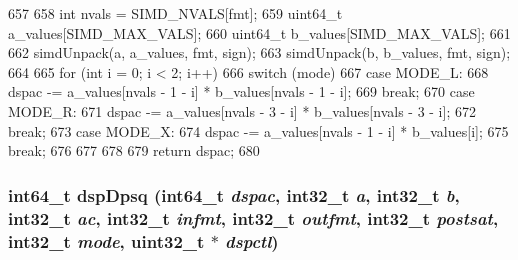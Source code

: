 \begin{DoxyCode}
657 {
658     int nvals = SIMD_NVALS[fmt];
659     uint64_t a_values[SIMD_MAX_VALS];
660     uint64_t b_values[SIMD_MAX_VALS];
661 
662     simdUnpack(a, a_values, fmt, sign);
663     simdUnpack(b, b_values, fmt, sign);
664 
665     for (int i = 0; i < 2; i++) {
666         switch (mode) {
667           case MODE_L:
668             dspac -= a_values[nvals - 1 - i] * b_values[nvals - 1 - i];
669             break;
670           case MODE_R:
671             dspac -= a_values[nvals - 3 - i] * b_values[nvals - 3 - i];
672             break;
673           case MODE_X:
674             dspac -= a_values[nvals - 1 - i] * b_values[i];
675             break;
676         }
677     }
678 
679     return dspac;
680 }
\end{DoxyCode}
\hypertarget{namespaceMipsISA_af540064c201122fe024672680efb7b83}{
\subsubsection[{dspDpsq}]{\setlength{\rightskip}{0pt plus 5cm}int64\_\-t dspDpsq (int64\_\-t {\em dspac}, \/  int32\_\-t {\em a}, \/  int32\_\-t {\em b}, \/  int32\_\-t {\em ac}, \/  int32\_\-t {\em infmt}, \/  int32\_\-t {\em outfmt}, \/  int32\_\-t {\em postsat}, \/  int32\_\-t {\em mode}, \/  {\bf uint32\_\-t} $\ast$ {\em dspctl})}}
\label{namespaceMipsISA_af540064c201122fe024672680efb7b83}



